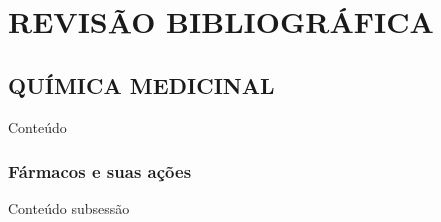 \chapter{REVISÃO BIBLIOGRÁFICA}

\section{QUÍMICA MEDICINAL}

Conteúdo

\subsection{Fármacos e suas ações}
Conteúdo subsessão
